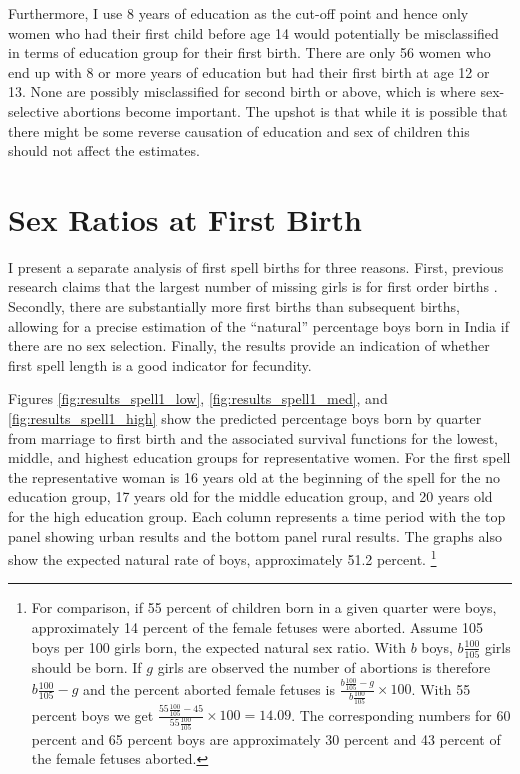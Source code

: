 \documentclass[12pt,letterpaper]{article}
\begin{document}
Furthermore, I use 8 years of education as the cut-off point and hence only women who
had their first child before age 14 would potentially be misclassified in terms of
education group for their first birth. 
There are only 56 women who end up with 8 or more years of education but had their
first birth at age 12 or 13.
None are possibly misclassified for second birth or above, which is where sex-selective 
abortions become important.
The upshot is that while it is possible that there might be some reverse causation of
education and sex of children this should not affect the estimates.




\clearpage
\newpage

\section{Sex Ratios at First Birth}

\setcounter{figure}{0}
\setcounter{table}{0}



I present a separate analysis of first spell births for three reasons.
First, previous research claims that the largest number of missing girls
is for first order births \citep{jha06}.
Secondly, there are substantially more first births than subsequent births, allowing
for a precise estimation of the ``natural'' percentage boys born in India if there
are no sex selection.
Finally, the results provide an indication of whether first spell length is
a good indicator for fecundity.

Figures \ref{fig:results_spell1_low}, \ref{fig:results_spell1_med}, and 
\ref{fig:results_spell1_high} show the predicted
percentage boys born by quarter from marriage to first birth and the associated
survival functions for the lowest, middle, and highest education groups for representative 
women.
For the first spell the representative woman is 16 years old at the beginning of the 
spell for the no education group, 17 years old for the middle education group, and 
20 years old for the high education group.
Each column represents a time period with the top panel showing urban results and 
the bottom panel rural results.
The graphs also show the expected natural rate of boys, approximately 51.2 percent.%
\footnote{
For comparison, if 55 percent of children born in a given quarter were boys,
approximately 14 percent of the female fetuses were aborted.
Assume 105 boys per 100 girls born, the expected natural sex ratio.
With $b$ boys,  $b\frac{100}{105}$ girls should be born.
If $g$ girls are observed the number of abortions is therefore $b\frac{100}{105}-g$
and the percent aborted female fetuses is 
$\frac{b\frac{100}{105}-g}{b\frac{100}{105}}\times 100$.
With 55 percent boys we get $\frac{55\frac{100}{105}-45}{55\frac{100}{105}}\times 100 = 14.09$.
The corresponding numbers for 60 percent and 65 percent boys are approximately 30 percent and
43 percent of the female fetuses aborted.
}
\end{document}
